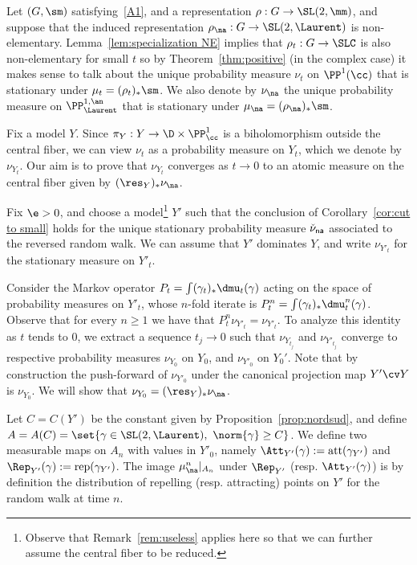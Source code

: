 Let $(G, \sm)$ satisfying~\eqref{A1}, and a representation $\rho : G \to \SL(2, \mm)$, and suppose that the induced representation $\rho_\na: G \to \SL(2, \Laurent)$ is non-elementary. Lemma~\ref{lem:specialization NE} implies that $\rho_t: G \to \SLC$ is also non-elementary for small $t$ so by Theorem~\ref{thm:positive} (in the complex case) it makes sense to talk about the unique probability measure $\nu_t$ on $\PP^1(\cc)$ that is stationary under $\mu_t = (\rho_t)_* \sm$. We also denote by $\nu_\na$ the unique probability measure on $\PP^{1,\an}_{\Laurent}$ that is stationary under $\mu_\na = (\rho_\na)_* \sm$.

Fix a model $Y$. Since $\pi_Y: Y \to \D \times \PP^1_\cc$ is a biholomorphism outside the central fiber, we can view $\nu_t$ as a probability measure on $Y_t$, which we denote by $\nu_{Y_t}$. Our aim is to prove that $\nu_{Y_t}$ converges as $t\to 0$ to an atomic measure on the central fiber given by $(\res_Y)_* \nu_\na$.

Fix $\e>0$, and choose a model\footnote{Observe that Remark~\ref{rem:useless} applies here so that we can further assume the central fiber to be reduced.} $Y'$ such that the conclusion of Corollary~\ref{cor:cut to small} holds for the unique stationary probability measure $\check\nu_{\sf na}$ associated to the reversed random walk. We can assume that $Y'$ dominates $Y$, and write $\nu_{Y'_t}$ for the stationary measure on $Y'_t$.

Consider the Markov operator $P_t = \int (\gamma_t)_* \dmu_t(\gamma)$ acting on the space of probability measures on $Y'_t$, whose $n$-fold iterate is $P_t^n = \int (\gamma_t)_* \dmu_t^n(\gamma)$. Observe that for every $n\geq 1$ we have that $P_t^n\nu_{Y'_t}= \nu_{Y'_t}$. To analyze this identity as $t$ tends to 0, we extract a sequence $t_j\to0$ such that $\nu_{Y_{t_j}}$ and $\nu_{Y'_{t_j}}$ converge to respective probability measures $\nu_{Y_0}$ on $Y_0$, and $\nu_{Y'_0}$ on $Y_0'$. Note that by construction the push-forward of $\nu_{Y'_0}$ under the canonical projection map $Y' \cv Y$ is $\nu_{Y_0}$. We will show that $\nu_{Y_0} = (\res_Y)_* \nu_\na$.

Let $C = C(Y')$ be the constant given by Proposition~\ref{prop:nordsud}, and define $A = A(C)= \set{\gamma\in \SL(2, \Laurent), \ \norm{\gamma}\geq C}$. We define two measurable maps on $A_n$ with values in $Y'_0$, namely $\Att_{Y'}(\gamma):= \mathrm{att}(\gamma_{Y'})$ and $\Rep_{Y'}(\gamma):= \mathrm{rep}(\gamma_{Y'})$. The image $\mu^n_\na|_{A_n}$ under $\Rep_{Y'}$ (resp. $\Att_{Y'}(\gamma)$) is by definition the distribution of repelling (resp. attracting) points on $Y'$ for the random walk at time $n$.


